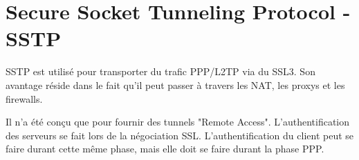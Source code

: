 \section{Secure Socket Tunneling Protocol - SSTP}
SSTP est utilisé pour transporter du trafic PPP/L2TP via du SSL3.
Son avantage réside dans le fait qu'il peut passer à travers les NAT, les proxys et les firewalls.

Il n'a été conçu que pour fournir des tunnels "Remote Access".
L'authentification des serveurs se fait lors de la négociation SSL.
L'authentification du client peut se faire durant cette même phase, mais elle doit se faire durant la phase PPP.